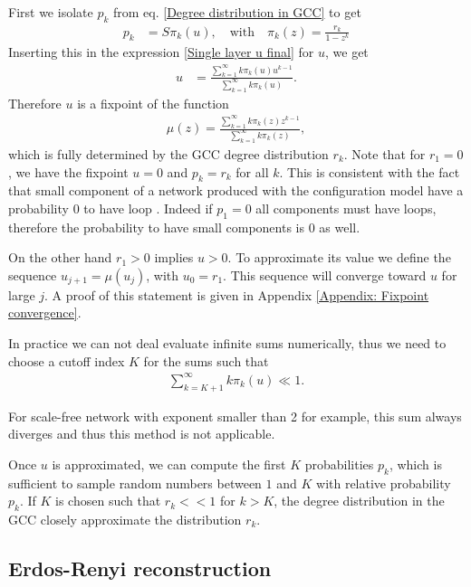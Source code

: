 \documentclass[
11pt, %
english, %
singlespacing, %
nolistspacing, %
liststotoc, %
headsepline, %
]{MastersDoctoralThesis} %
\begin{document}
First we isolate $p_k$ from eq. \eqref{Degree distribution in GCC} to get
\begin{align}
	p_k &= S \pi_k(u), \quad \text{with} \quad \pi_k(z) = \frac{r_k}{1 - z^k}
\end{align}
Inserting this in the expression \eqref{Single layer u final} for $u$, we get
\begin{align}
	u &= \frac{\sum_{k=1}^\infty k \pi_k(u) u^{k-1}}{\sum_{k=1}^\infty k \pi_k(u)}. \label{Fixpoint equation for u}
\end{align}
Therefore $u$ is a fixpoint of the function
\begin{align}
	\mu(z) = \frac{\sum_{k=1}^\infty k \pi_k(z) z^{k-1}}{\sum_{k=1}^\infty k \pi_k(z)}, \label{Defition of mu}
\end{align}
which is fully determined by the GCC degree distribution $r_k$. Note that for $r_1 = 0$, we have the fixpoint $u = 0$ and $p_k = r_k$ for all $k$. This is consistent with the fact that small component of a network produced with the configuration model have a probability $0$ to have loop \cite{newman2010networks}. Indeed if $p_1 = 0$ all components must have loops, therefore the probability to have small components is $0$ as well.

On the other hand $r_1 > 0$ implies $u > 0$. To approximate its value we define the sequence $u_{j+1} = \mu(u_j)$, with $u_0 = r_1$. This sequence will converge toward $u$ for large $j$. A proof of this statement is given in Appendix \ref{Appendix: Fixpoint convergence}.

In practice we can not deal evaluate infinite sums numerically, thus we need to choose a cutoff index $K$ for the sums such that
\begin{align}
	\sum_{k=K+1}^\infty k \pi_k(u) \ll 1.
\end{align}

For scale-free network with exponent smaller than 2 for example, this sum always diverges and thus this method is not applicable.

Once $u$ is approximated, we can compute the first $K$ probabilities $p_k$, which is sufficient to sample random numbers between $1$ and $K$ with relative probability $p_k$. If $K$ is chosen such that $r_k << 1$ for $k > K$, the degree distribution in the GCC closely approximate the distribution $r_k$.

\subsection{Erdos-Renyi reconstruction}
\end{document}
